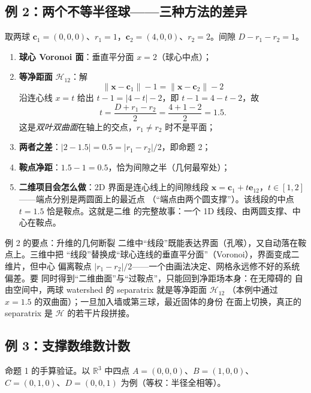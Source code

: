 \documentclass[UTF8,zihao=-4]{ctexart}
\newcommand{\R}{\mathbb{R}}
\newcommand{\cc}{\bm c}
\begin{document}
\subsection{例 2：两个不等半径球——三种方法的差异}

取两球 $\cc_1=(0,0,0)$、$r_1=1$，$\cc_2=(4,0,0)$、$r_2=2$。间隙
$D-r_1-r_2=1$。

\begin{enumerate}
  \item \textbf{球心 Voronoi 面}：垂直平分面 $x=2$（球心中点）；
  \item \textbf{等净距面} $\mathcal H_{12}$：解
  \begin{equation}
    \|\bm x-\cc_1\|-1=\|\bm x-\cc_2\|-2
  \end{equation}
  沿连心线 $x=t$ 给出 $t-1=|4-t|-2$，即 $t-1=4-t-2$，故
  \begin{equation}
    t=\frac{D+r_1-r_2}{2}=\frac{4+1-2}{2}=1.5.
  \end{equation}
  这是\emph{双叶双曲面}在轴上的交点，$r_1\ne r_2$ 时不是平面；
  \item \textbf{两者之差}：$|2-1.5|=0.5=|r_1-r_2|/2$，即命题 2；
  \item \textbf{鞍点净距}：$1.5-1=0.5$，恰为间隙之半（几何最窄处）；
  \item \textbf{二维项目会怎么做}：2D 界面是连心线上的间隙线段
  $\bm x=\cc_1+t\bm e_{12}$，$t\in[1,2]$——端点分别是两圆面上的最近点
  （``端点由两个圆支撑''）。该线段的中点 $t=1.5$ 恰是鞍点。这就是二维
  的完整故事：一个 1D 线段、由两圆支撑、中心在鞍点。
\end{enumerate}

\begin{keybox}{例 2 的要点：升维的几何断裂}
二维中``线段''既能表达界面（孔喉），又自动落在鞍点上。三维中把
``线段''替换成``球心连线的垂直平分面''（Voronoi），界面变成二维片，但中心
偏离鞍点 $|r_1-r_2|/2$——一个由画法决定、网格永远修不好的系统偏差。要
同时得到``二维曲面''与``过鞍点''，只能回到净距场本身：在无障碍的
自由空间中，两球 watershed 的 separatrix 就是等净距面 $\mathcal H_{12}$
（本例中通过 $x=1.5$ 的双曲面）；一旦加入墙或第三球，最近固体的身份
在面上切换，真正的 separatrix 是 $\mathcal H$ 的若干片段拼接。
\end{keybox}

\subsection{例 3：支撑数维数计数}

命题 1 的手算验证。以 $\R^3$ 中四点 $A=(0,0,0)$、$B=(1,0,0)$、
$C=(0,1,0)$、$D=(0,0,1)$ 为例（等权：半径全相等）。
\end{document}
